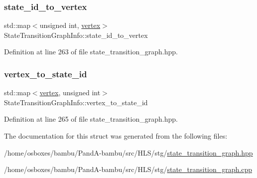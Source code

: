 \subsubsection{\texorpdfstring{state\+\_\+id\+\_\+to\+\_\+vertex}{state\_id\_to\_vertex}}
{\footnotesize\ttfamily std\+::map$<$unsigned int, \hyperlink{graph_8hpp_abefdcf0544e601805af44eca032cca14}{vertex}$>$ State\+Transition\+Graph\+Info\+::state\+\_\+id\+\_\+to\+\_\+vertex}



Definition at line 263 of file state\+\_\+transition\+\_\+graph.\+hpp.

\mbox{\label{structStateTransitionGraphInfo_aea24a9a16db997ca57c051c896fe1ed8}} 
\subsubsection{\texorpdfstring{vertex\+\_\+to\+\_\+state\+\_\+id}{vertex\_to\_state\_id}}
{\footnotesize\ttfamily std\+::map$<$\hyperlink{graph_8hpp_abefdcf0544e601805af44eca032cca14}{vertex}, unsigned int$>$ State\+Transition\+Graph\+Info\+::vertex\+\_\+to\+\_\+state\+\_\+id}



Definition at line 265 of file state\+\_\+transition\+\_\+graph.\+hpp.



The documentation for this struct was generated from the following files\+:\begin{DoxyCompactItemize}
\item 
/home/osboxes/bambu/\+Pand\+A-\/bambu/src/\+H\+L\+S/stg/\hyperlink{state__transition__graph_8hpp}{state\+\_\+transition\+\_\+graph.\+hpp}\item 
/home/osboxes/bambu/\+Pand\+A-\/bambu/src/\+H\+L\+S/stg/\hyperlink{state__transition__graph_8cpp}{state\+\_\+transition\+\_\+graph.\+cpp}\end{DoxyCompactItemize}
